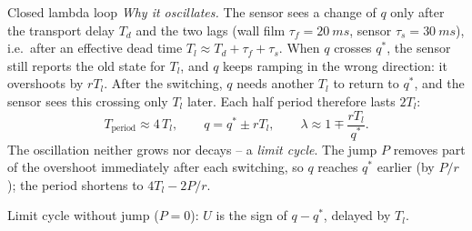 \begin{exercise}{Closed lambda loop}{\Wokwi}
\emph{Why it oscillates.} The sensor sees a change of $q$ only after the
transport delay $T_d$ and the two lags (wall film $\tau_f=\SI{20}{ms}$, sensor
$\tau_s=\SI{30}{ms}$), i.e.\ after an effective dead time
$T_l\approx T_d+\tau_f+\tau_s$. When $q$ crosses $q^*$, the sensor still reports
the old state for $T_l$, and $q$ keeps ramping in the wrong direction: it
overshoots by $rT_l$. After the switching, $q$ needs another $T_l$ to return to
$q^*$, and the sensor sees this crossing only $T_l$ later. Each half period
therefore lasts $2T_l$:
\[ T_{\text{period}}\approx4\,T_l,\qquad q=q^*\pm rT_l,\qquad
   \lambda\approx1\mp\frac{rT_l}{q^*}. \]
The oscillation neither grows nor decays -- a \emph{limit cycle}. The jump $P$
removes part of the overshoot immediately after each switching, so $q$ reaches
$q^*$ earlier (by $P/r$); the period shortens to $4T_l-2P/r$.
\begin{center}

Limit cycle without jump ($P=0$): $U$ is the sign of $q-q^*$, delayed by $T_l$.
\end{center}


\end{exercise}

